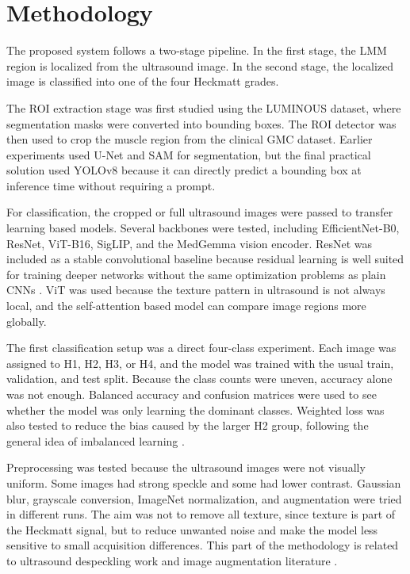 \chapter{Methodology}
\label{chap:methodology}
\label{methodology}
The proposed system follows a two-stage pipeline. In the first stage, the LMM region is localized from the ultrasound image. In the second stage, the localized image is classified into one of the four Heckmatt grades.

The ROI extraction stage was first studied using the LUMINOUS dataset, where segmentation masks were converted into bounding boxes. The ROI detector was then used to crop the muscle region from the clinical GMC dataset. Earlier experiments used U-Net and SAM for segmentation, but the final practical solution used YOLOv8 because it can directly predict a bounding box at inference time without requiring a prompt.

For classification, the cropped or full ultrasound images were passed to transfer learning based models. Several backbones were tested, including EfficientNet-B0, ResNet, ViT-B16, SigLIP, and the MedGemma vision encoder. ResNet was included as a stable convolutional baseline because residual learning is well suited for training deeper networks without the same optimization problems as plain CNNs \cite{he2016resnet}. ViT was used because the texture pattern in ultrasound is not always local, and the self-attention based model can compare image regions more globally.

The first classification setup was a direct four-class experiment. Each image was assigned to H1, H2, H3, or H4, and the model was trained with the usual train, validation, and test split. Because the class counts were uneven, accuracy alone was not enough. Balanced accuracy and confusion matrices were used to see whether the model was only learning the dominant classes. Weighted loss was also tested to reduce the bias caused by the larger H2 group, following the general idea of imbalanced learning \cite{HeGarcia2009,Cui2019}.

Preprocessing was tested because the ultrasound images were not visually uniform. Some images had strong speckle and some had lower contrast. Gaussian blur, grayscale conversion, ImageNet normalization, and augmentation were tried in different runs. The aim was not to remove all texture, since texture is part of the Heckmatt signal, but to reduce unwanted noise and make the model less sensitive to small acquisition differences. This part of the methodology is related to ultrasound despeckling work \cite{YuActon2002,Loizou2005} and image augmentation literature \cite{Shorten2019,Cubuk2019}.

